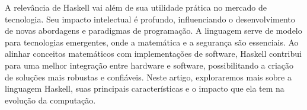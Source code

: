 A relevância de Haskell vai além de sua utilidade prática no mercado de tecnologia. Seu impacto intelectual é profundo, influenciando o desenvolvimento de novas abordagens e paradigmas de programação. A linguagem serve de modelo para tecnologias emergentes, onde a matemática e a segurança são essenciais. Ao alinhar conceitos matemáticos com implementações de software, Haskell contribui para uma melhor integração entre hardware e software, possibilitando a criação de soluções mais robustas e confiáveis. Neste artigo, exploraremos mais sobre a linguagem Haskell, suas principais características e o impacto que ela tem na evolução da computação.
